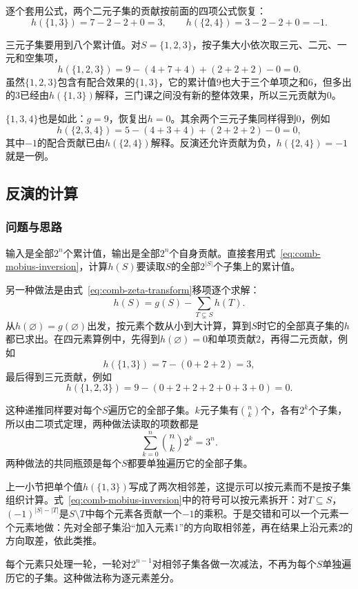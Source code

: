 逐个套用公式，两个二元子集的贡献按前面的四项公式恢复：
\[
  h(\{1,3\})=7-2-2+0=3,\qquad h(\{2,4\})=3-2-2+0=-1.
\]

三元子集要用到八个累计值。对$S=\{1,2,3\}$，按子集大小依次取三元、二元、一元和空集项，
\[
  h(\{1,2,3\})=9-(4+7+4)+(2+2+2)-0=0.
\]
虽然$\{1,2,3\}$包含有配合效果的$\{1,3\}$，它的累计值$9$也大于三个单项之和$6$，但多出的$3$已经由$h(\{1,3\})$解释，三门课之间没有新的整体效果，所以三元贡献为$0$。

$\{1,3,4\}$也是如此：$g=9$，恢复出$h=0$。其余两个三元子集同样得到$0$，例如
\[
  h(\{2,3,4\})=5-(4+3+4)+(2+2+2)-0=0,
\]
其中$-1$的配合贡献已由$h(\{2,4\})$解释。反演还允许贡献为负，$h(\{2,4\})=-1$就是一例。

\subsection{反演的计算}
\label{sec:graph-setfn-mobius-computation}

\subsubsection{问题与思路}

输入是全部$2^n$个累计值，输出是全部$2^n$个自身贡献。直接套用式~\eqref{eq:comb-mobius-inversion}，计算$h(S)$要读取$S$的全部$2^{|S|}$个子集上的累计值。

另一种做法是由式~\eqref{eq:comb-zeta-transform}移项逐个求解：
\[
  h(S)=g(S)-\sum_{T\subsetneq S}h(T).
\]
从$h(\varnothing)=g(\varnothing)$出发，按元素个数从小到大计算，算到$S$时它的全部真子集的$h$都已求出。在四元素算例中，先得到$h(\varnothing)=0$和单项贡献$2$，再得二元贡献，例如
\[
  h(\{1,3\})=7-(0+2+2)=3,
\]
最后得到三元贡献，例如
\[
  h(\{1,2,3\})=9-(0+2+2+2+0+3+0)=0.
\]

这种递推同样要对每个$S$遍历它的全部子集。$k$元子集有$\binom nk$个，各有$2^k$个子集，所以由二项式定理，两种做法读取的项数都是
\[
  \sum_{k=0}^{n}\binom nk2^k=3^n.
\]
两种做法的共同瓶颈是每个$S$都要单独遍历它的全部子集。

上一小节把单个值$h(\{1,3\})$写成了两次相邻差，这提示可以按元素而不是按子集组织计算。式~\eqref{eq:comb-mobius-inversion}中的符号可以按元素拆开：对$T\subseteq S$，$(-1)^{|S|-|T|}$是$S\setminus T$中每个元素各贡献一个$-1$的乘积。于是交错和可以一个元素一个元素地做：先对全部子集沿“加入元素$1$”的方向取相邻差，再在结果上沿元素$2$的方向取差，依此类推。

每个元素只处理一轮，一轮对$2^{n-1}$对相邻子集各做一次减法，不再为每个$S$单独遍历它的子集。这种做法称为逐元素差分。

